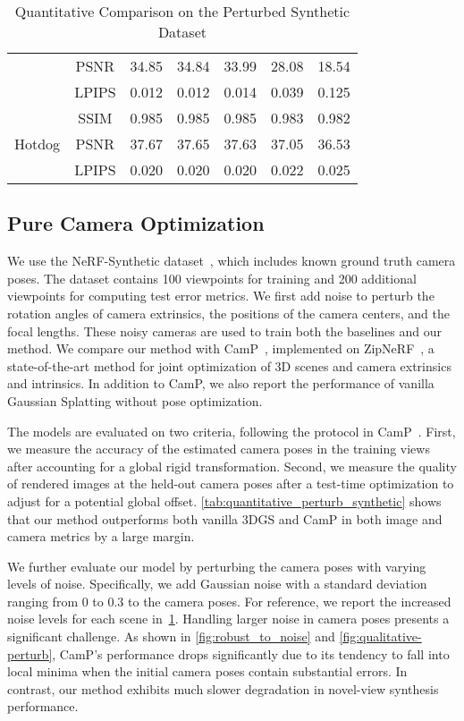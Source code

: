 \begin{table}[htbp]
{\begin{tabular}{c|cccccc}
                           & PSNR  & 34.85 & 34.84 & 33.99 & 28.08 & 18.54 \\
                           & LPIPS & 0.012 & 0.012 & 0.014 & 0.039 & 0.125 \\
    \midrule
    \multirow{3}{*}{Hotdog} & SSIM  & 0.985 & 0.985 & 0.985 & 0.983 & 0.982 \\
                            & PSNR  & 37.67 & 37.65 & 37.63 & 37.05 & 36.53 \\
                            & LPIPS & 0.020 & 0.020 & 0.020 & 0.022 & 0.025 \\
    \bottomrule
    \end{tabular}%
  }
  \caption{Quantitative Comparison on the Perturbed Synthetic Dataset}
\label{tab:perturb-syn}%
\end{table}%



\subsection{Pure Camera Optimization} 
\label{sec:2.3}
We use the NeRF-Synthetic dataset~\cite{mildenhall2021nerf}, which includes known ground truth camera poses. 
The dataset contains 100 viewpoints for training and 200 additional viewpoints for computing test error metrics.
We first add noise to perturb the rotation angles of camera extrinsics, the positions of the camera centers, and the focal lengths. 
These noisy cameras are used to train both the baselines and our method.
We compare our method with CamP~\cite{park2023camp}, implemented on ZipNeRF~\cite{barron2023zip}, a state-of-the-art method for joint optimization of 3D scenes and camera extrinsics and intrinsics. In addition to CamP, we also report the performance of vanilla Gaussian Splatting without pose optimization.

The models are evaluated on two criteria, following the protocol in CamP~\cite{park2023camp}.
First, we measure the accuracy of the estimated camera poses in the training views after accounting for a global rigid transformation. 
Second, we measure the quality of rendered images at the held-out camera poses after a test-time optimization to adjust for a potential global offset. 
\cref{tab:quantitative_perturb_synthetic} shows that our method outperforms both vanilla 3DGS and CamP in both image and camera metrics by a large margin.

We further evaluate our model by perturbing the camera poses with varying levels of noise. Specifically, we add Gaussian noise with a standard deviation ranging from 0 to 0.3 to the camera poses. For reference, we report the increased noise levels for each scene in~\cref{tab:perturb-syn}. Handling larger noise in camera poses presents a significant challenge. As shown in \cref{fig:robust_to_noise} and \cref{fig:qualitative-perturb}, CamP’s performance drops significantly due to its tendency to fall into local minima when the initial camera poses contain substantial errors. In contrast, our method exhibits much slower degradation in novel-view synthesis performance.

